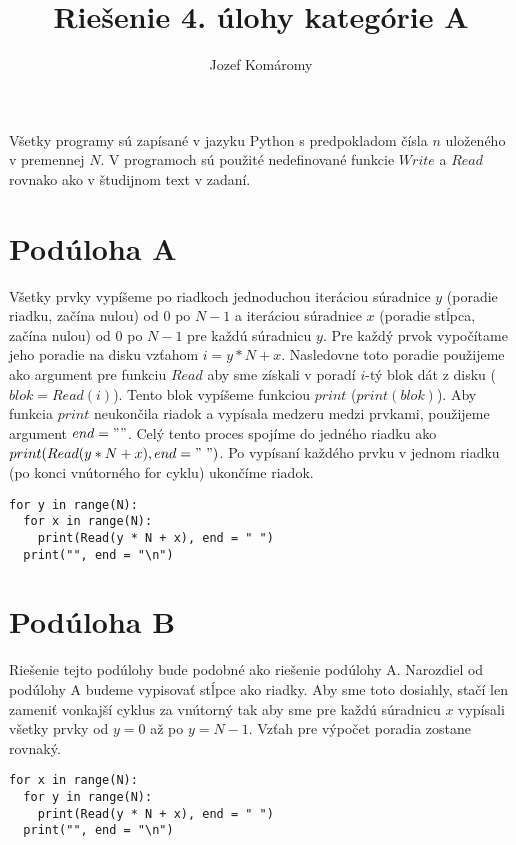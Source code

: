 \documentclass{article}
\begin{document}
\title{Riešenie 4. úlohy kategórie A}
\author{Jozef Komáromy}

\maketitle


Všetky programy sú zapísané v jazyku Python s predpokladom čísla $n$ uloženého v premennej $N$. V programoch sú použité nedefinované funkcie $Write$ a $Read$ rovnako ako v študijnom text v zadaní.

\section*{Podúloha A}

Všetky prvky vypíšeme po riadkoch jednoduchou iteráciou súradnice $y$ (poradie riadku, začína nulou) od $0$ po $N-1$ a iteráciou súradnice $x$ (poradie stĺpca, začína nulou) od $0$ po $N-1$ pre každú súradnicu $y$. Pre každý prvok vypočítame jeho poradie na disku vzťahom $i = y * N + x$. Nasledovne toto poradie použijeme ako argument pre funkciu $Read$ aby sme získali v poradí $i$-tý blok dát z disku ($blok = Read(i)$). Tento blok vypíšeme funkciou $print$ (\(print(blok)\)). Aby funkcia $print$ neukončila riadok a vypísala medzeru medzi prvkami, použijeme argument \(end = " "\). Celý tento proces spojíme do jedného riadku ako \(print(Read(y * N + x), end = "\ ")\). Po vypísaní každého prvku v jednom riadku (po konci vnútorného for cyklu) ukončíme riadok.

\begin{lstlisting}
for y in range(N):
  for x in range(N):
    print(Read(y * N + x), end = " ")
  print("", end = "\n")
\end{lstlisting}

\section*{Podúloha B}

Riešenie tejto podúlohy bude podobné ako riešenie podúlohy A. Narozdiel od podúlohy A budeme vypisovať stĺpce ako riadky. Aby sme toto dosiahly, stačí len zameniť vonkajší cyklus za vnútorný tak aby sme pre každú súradnicu $x$ vypísali všetky prvky od $y = 0$ až po $y = N-1$. Vzťah pre výpočet poradia zostane rovnaký.

\begin{lstlisting}
for x in range(N):
  for y in range(N):
    print(Read(y * N + x), end = " ")
  print("", end = "\n")
\end{lstlisting}
\end{document}
